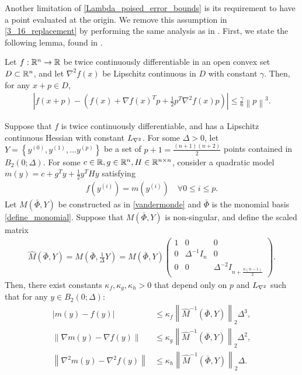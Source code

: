 \documentclass{article}
\begin{document}
Another limitation of \cref{Lambda_poised_error_bounds} is its requirement to have a point evaluated at the origin.
We remove this assumption in \cref{3_16_replacement} by performing the same analysis as in \cite[Theorem 3.16]{introduction_book}.
First, we state the following lemma, found in \cite[Lemma 4.1.14]{dennisschnabel1983}.

\begin{theorem}
\label{4_1_14}
Let $f : \mathbb R^n \to \mathbb R$ be twice continuously differentiable in an open convex set $D \subset \mathbb R^n$,
and let $\nabla^2 f(x)$ be Lipschitz continuous in $D$ with constant $\gamma$.
Then, for any $x + p\in D$,
\begin{align*}
\left|f(x + p) - \left(f(x) + \nabla f(x)^T p + \frac 1 2 p^T \nabla^2 f(x)p\right) \right|
\le \frac {\gamma} 6 \left\|p\right\|^3.
\end{align*}
\end{theorem}

\begin{theorem}
\label{3_16_replacement}
Suppose that $f$ is twice continuously differentiable, and has a Lipschitz continuous Hessian with constant ${L_{\nabla^2}}$.
For some $\Delta > 0$, let $Y = \left\{y^{(0)}, y^{(1)}, \ldots y^{(p)} \right\}$ be a set of
$p+1=\frac{(n+1)(n+2)}{2}$ points contained in $B_2\left(0; \Delta\right)$.
For some $c \in \mathbb R, g \in \mathbb R^n, H \in \mathbb R^{n \times n}$, consider a quadratic model $m(y) = c + g^T y + \frac 1 2 y^T H y$  satisfying
\begin{align}
f\left(y^{(i)}\right) = m\left(y^{(i)}\right) \quad \forall 0 \le i \le p. \label{nce_interpolation_condition}
\end{align}
Let $M(\bar \Phi,Y)$ be constructed as in \cref{vandermonde} and $\bar \Phi$ is the monomial basis \cref{define_monomial}.
Suppose that $M(\bar \Phi,Y)$ is non-singular, and define the scaled matrix
\begin{align}
\hat M\left(\bar \Phi, Y\right) = M\left(\bar \Phi, \frac 1 {\Delta} Y\right) = M\left(\bar \Phi,Y\right) \begin{pmatrix}
1 & 0 & 0 \\
0 & \Delta^{-1} I_n & 0 \\
0 & 0 & \Delta^{-2} I_{n + \frac{n(n-1)}{2}}
\end{pmatrix}. \label{nce_scale}
\end{align}
Then, there exist constants $\kappa_f, \kappa_g, \kappa_h>0$ that depend only on $p$ and ${L_{\nabla^2}}$ such that
for any $y \in B_2\left(0; \Delta\right)$:
\begin{align}
\left|m(y) - f(y)\right| &\le \kappa_f \left\|\hat M^{-1}(\bar \Phi, Y) \right\|_2 \Delta^3, \label{error_in_function}  \\
\left\|\nabla m(y) - \nabla f(y)\right\| &\le \kappa_g \left\|\hat M^{-1}(\bar \Phi, Y) \right\|_2\Delta^2, \label{error_in_gradient} \\
\left\|\nabla^2 m(y) - \nabla^2 f(y)\right\| &\le \kappa_h \left\|\hat M^{-1}(\bar \Phi, Y) \right\|_2\Delta. \label{error_in_hessian}
\end{align}
\end{theorem}
\end{document}
